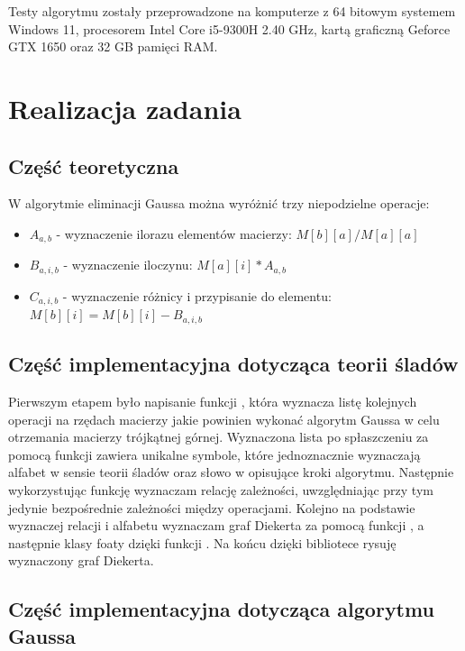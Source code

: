 \documentclass{article}
\begin{document}
Testy algorytmu zostały przeprowadzone na komputerze z 64 bitowym systemem Windows 11, procesorem Intel Core i5-9300H 2.40 GHz, kartą graficzną Geforce GTX 1650 oraz 32 GB pamięci RAM.

\section{Realizacja zadania}

\subsection{Część teoretyczna}

W algorytmie eliminacji Gaussa można wyróżnić trzy niepodzielne operacje:

\begin{itemize}
    \item \(A_{a, b}\) - wyznaczenie ilorazu elementów macierzy: \(M[b][a] / M[a][a]\)
    \item \(B_{a, i, b}\) - wyznaczenie iloczynu: \(M[a][i]  * A_{a, b}\)
    \item \(C_{a, i, b}\) - wyznaczenie różnicy i przypisanie do elementu: \(M[b][i] = M[b][i] - B_{a, i, b} \)
\end{itemize}

\subsection{Część implementacyjna dotycząca teorii śladów}

Pierwszym etapem było napisanie funkcji , która wyznacza listę kolejnych operacji na rzędach macierzy jakie powinien wykonać algorytm Gaussa w celu otrzemania macierzy trójkątnej górnej. Wyznaczona lista po spłaszczeniu za pomocą funkcji  zawiera unikalne symbole, które jednoznacznie wyznaczają alfabet w sensie teorii śladów oraz słowo w opisujące kroki algorytmu. Następnie wykorzystując funkcję  wyznaczam relację zależności, uwzględniając przy tym jedynie bezpośrednie zależności między operacjami. Kolejno na podstawie wyznaczej relacji i alfabetu wyznaczam graf Diekerta za pomocą funkcji , a następnie klasy foaty dzięki funkcji . Na końcu dzięki bibliotece  rysuję wyznaczony graf Diekerta.

\subsection{Część implementacyjna dotycząca algorytmu Gaussa}
\end{document}
